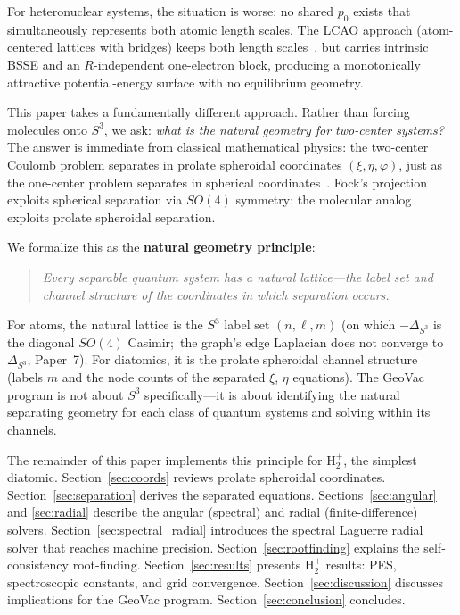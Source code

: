 \documentclass[aps,pra,twocolumn,superscriptaddress,longbibliography]{revtex4-2}
\begin{document}
For heteronuclear systems, the situation is worse: no shared $p_0$
exists that simultaneously represents both atomic length scales.
The LCAO approach (atom-centered lattices with bridges) keeps both
length scales~\cite{loutey_lcao_fci}, but carries intrinsic BSSE and
an $R$-independent one-electron block, producing a monotonically attractive
potential-energy surface with no equilibrium geometry.

This paper takes a fundamentally different approach.  Rather than
forcing molecules onto $S^3$, we ask: \emph{what is the natural
geometry for two-center systems?}  The answer is immediate from
classical mathematical physics: the two-center Coulomb problem
separates in prolate spheroidal coordinates $(\xi, \eta, \varphi)$,
just as the one-center problem separates in spherical
coordinates~\cite{Bates1953, Morse1953}.  Fock's projection exploits
spherical separation via $SO(4)$ symmetry; the molecular analog
exploits prolate spheroidal separation.

We formalize this as the \textbf{natural geometry principle}:
\begin{quote}
\emph{Every separable quantum system has a natural lattice---the
label set and channel structure of the coordinates in which separation
occurs.}
\end{quote}
For atoms, the natural lattice is the $S^3$ label set $(n,\ell,m)$
(on which $-\Delta_{S^3}$ is the diagonal $SO(4)$ Casimir;\ the graph's
edge Laplacian does not converge to $\Delta_{S^3}$, Paper~7).  For
diatomics, it is the prolate spheroidal channel structure (labels $m$
and the node counts of the separated $\xi$, $\eta$ equations).  The
GeoVac program is not about $S^3$ specifically---it is about
identifying the natural separating geometry for each class of quantum
systems and solving within its channels.

The remainder of this paper implements this principle for H$_2^+$,
the simplest diatomic.  Section~\ref{sec:coords} reviews prolate
spheroidal coordinates.  Section~\ref{sec:separation} derives the
separated equations.  Sections~\ref{sec:angular} and \ref{sec:radial}
describe the angular (spectral) and radial (finite-difference) solvers.
Section~\ref{sec:spectral_radial} introduces the spectral Laguerre
radial solver that reaches machine precision.
Section~\ref{sec:rootfinding} explains the self-consistency
root-finding.  Section~\ref{sec:results} presents H$_2^+$ results:
PES, spectroscopic constants, and grid convergence.
Section~\ref{sec:discussion} discusses implications for the GeoVac
program.  Section~\ref{sec:conclusion} concludes.
\end{document}
